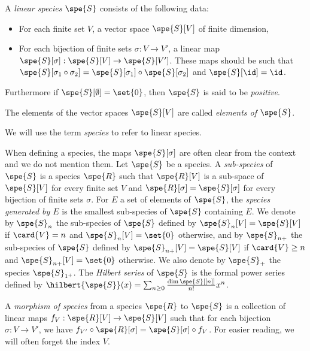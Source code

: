 \begin{defi}
    A {\em linear species} $\spe{S}$ consists of the following data:
    \begin{itemize}
       \item For each finite set $V$, a vector space $\spe{S}[V]$ of finite dimension,
       \item For each bijection of finite sets $\sigma: V\to V'$, a linear map 
       $\spe{S}[\sigma]:\spe{S}[V]\to \spe{S}[V']$.
       These maps should be such that 
       $\spe{S}[\sigma_1\circ\sigma_2] = \spe{S}[\sigma_1]\circ \spe{S}[\sigma_2]$ 
       and $\spe{S}[\id] = \id$.
    \end{itemize}
    Furthermore if $\spe{S}[\emptyset]  = \set{0}$, then $\spe{S}$ is said to be {\em positive}.
    
    The elements of the vector spaces $\spe{S}[V]$ are called {\em elements of $\spe{S}$}.
\end{defi}

We will use the term {\em species} to refer to linear species.

When defining a species, the maps $\spe{S}[\sigma]$ are often clear from the context and we do not mention them.
Let $\spe{S}$ be a species. A {\em sub-species} of $\spe{S}$ is a species $\spe{R}$ such that $\spe{R}[V]$ is 
a sub-space of $\spe{S}[V]$ for every finite set $V$ and $\spe{R}[\sigma] = \spe{S}[\sigma]$ for every
bijection of finite sets $\sigma$. 
For $E$ a set of elements of $\spe{S}$, the {\em species generated by $E$} is the smallest sub-species of
$\spe{S}$ containing $E$.
We denote by $\spe{S}_{n}$ the sub-species of $\spe{S}$ defined by $\spe{S}_{n}[V]=\spe{S}[V]$ if 
$\card{V} = n$ and $\spe{S}_n[V]=\set{0}$ otherwise, and by $\spe{S}_{n+}$ the sub-species of $\spe{S}$
defined by $\spe{S}_{n+}[V]=\spe{S}[V]$ if $\card{V}\geq n$ and $\spe{S}_{n+}[V]=\set{0}$ otherwise.
We also denote by $\spe{S}_+$ the species $\spe{S}_{1^+}$. The {\em Hilbert series} of $\spe{S}$ is the 
formal power series defined by 
$\hilbert{\spe{S}}(x)=\sum_{n\geq 0}\frac{\dim\spe{S}[[n]]}{n!}x^n$.

A {\em morphism of species} from a species $\spe{R}$ to $\spe{S}$ is a collection of linear maps 
$f_V : \spe{R}[V] \to \spe{S}[V]$ such that for each bijection $\sigma: V\to V'$, we have 
$f_{V'}\circ \spe{R}[\sigma] = \spe{S}[\sigma]\circ f_V$. For easier reading, we will often forget 
the index $V$. 



